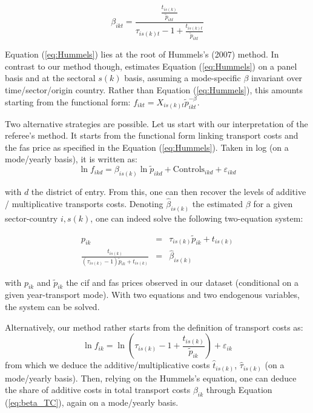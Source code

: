 \documentclass[a4paper,11pt]{article}
\begin{document}
\begin{itemize}
     \begin{equation}
     \beta_{ikt} = \frac{\frac{t_{is(k)}}{\widetilde{p}_{ikt}}}{\tau_{is(k)t}-1+\frac{t_{is(k)t}}{\widetilde{p}_{ikt}} } \label{eq:beta_TC}
     \end{equation}

     Equation (\ref{eq:Hummels}) lies at the root of Hummels's (2007) method. In contrast to our method though, \cite{hummels2007} estimates Equation (\ref{eq:Hummels}) on a panel basis and at the sectoral $s(k)$ basis, assuming a mode-specific $\beta$ invariant over time/sector/origin country. Rather than Equation (\ref{eq:Hummels}), this amounts starting from the functional form: $f_{ikt} = X_{is(k)t}\widetilde{p}_{ikt}^{-\beta}$.

     Two alternative strategies are possible. Let us start with our interpretation of the referee's method. It starts from the functional form linking transport costs and the fas price as specified in the Equation (\ref{eq:Hummels}). Taken in log (on a mode/yearly basis), it is written as:
     $$\ln f_{ikd} = \beta_{is(k)}\ln \widetilde{p}_{ikd} +\text{Controls}_{ikd}+ \varepsilon_{ikd}$$

     \noindent with $d$ the district of entry. From this, one can then recover the levels of additive / multiplicative transports costs. Denoting $\widehat{\beta}_{is(k)}$ the estimated $\beta$ for a given sector-country $i,s(k)$, one can indeed solve the following two-equation system:

\begin{eqnarray}
p_{ik} &=& \tau_{is(k)}\widetilde{p}_{ik} +t_{is(k)} \label{eq:system1}\\
\frac{t_{is(k)}}{(\tau_{is(k)}-1)\widetilde{p}_{ik}+ t_{is(k)}} &=& \widehat{\beta}_{is(k)}  \label{eq:system2}
\end{eqnarray}

\noindent with $p_{ik}$ and $\widetilde{p}_{ik}$ the cif and fas prices observed in our dataset (conditional on a given year-transport mode). With two equations and two endogenous variables, the system can be solved.

 Alternatively, our method rather starts from the definition of transport costs as:
     $$\ln f_{ik} = \ln\left(\tau_{is(k)} -1 + \frac{t_{is(k)}}{\widetilde{p}_{ik}}\right) +\varepsilon_{ik}$$
\noindent from which we deduce the additive/multiplicative costs $\widehat{t}_{is(k)}$, $\widehat{\tau}_{is(k)}$ (on a mode/yearly basis). Then, relying on the Hummels's equation, one can deduce the share of additive costs in total transport costs $\beta_{ik}$ through Equation (\ref{eq:beta_TC}), again on a mode/yearly basis.



\end{itemize}
\end{document}
